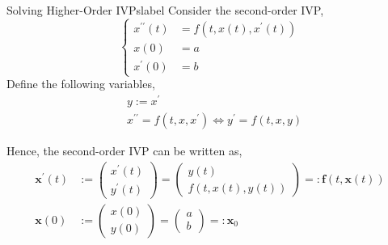 \begin{ex}{Solving Higher-Order IVPs}{label}
	Consider the second-order IVP,
	\[\left\{\begin{aligned}
	x^{\prime \prime}(t) &=f\left(t, x(t), x^{\prime}(t)\right) \\
	x(0) &=a \\
	x^{\prime}(0) &=b
	\end{aligned}\right.\]
	Define the following variables,
	\begin{align*}
		&y:=x^{\prime} \\
		&x^{\prime \prime}=f\left(t, x, x^{\prime}\right) \iff y^{\prime}=f(t, x, y)
	\end{align*}

	 Hence, the second-order IVP can be written as,
	\begin{align*} \mathbf{x}^{\prime}(t) &:=\left(\begin{array}{l}x^{\prime}(t) \\ y^{\prime}(t)\end{array}\right)=\left(\begin{array}{c}y(t) \\ f(t, x(t), y(t))\end{array}\right)=: \mathbf{f}(t, \mathbf{x}(t)) \\ \mathbf{x}(0) &:=\left(\begin{array}{c}x(0) \\ y(0)\end{array}\right)=\left(\begin{array}{l}a \\ b\end{array}\right)=: \mathbf{x}_0 \end{align*}
\end{ex}